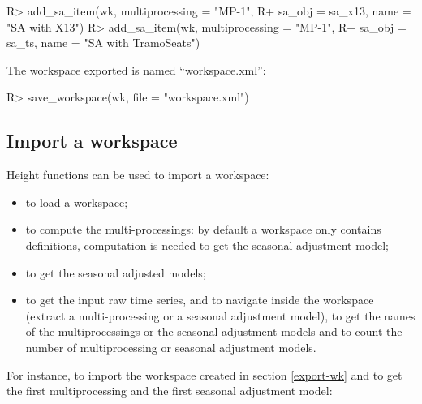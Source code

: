\documentclass[article]{jss}
\providecommand{\tightlist}{%
  \setlength{\itemsep}{0pt}\setlength{\parskip}{0pt}}
\begin{document}
\begin{CodeChunk}

\begin{CodeInput}
R> add_sa_item(wk, multiprocessing = "MP-1",
R+             sa_obj = sa_x13, name =  "SA with X13")
R> add_sa_item(wk, multiprocessing =  "MP-1",
R+             sa_obj = sa_ts, name = "SA with TramoSeats")
\end{CodeInput}
\end{CodeChunk}

The workspace exported is named ``workspace.xml'':

\begin{CodeChunk}

\begin{CodeInput}
R> save_workspace(wk, file =  "workspace.xml")
\end{CodeInput}
\end{CodeChunk}

\hypertarget{import-a-workspace}{%
\subsection{Import a workspace}\label{import-a-workspace}}

Height functions can be used to import a workspace:

\begin{itemize}
\tightlist
\item
   to load a workspace;\\
\item
   to compute the multi-processings: by default a
  workspace only contains definitions, computation is needed to get the
  seasonal adjustment model;\\
\item
   to get the seasonal adjusted models;\\
\item
   to get the input raw time series, 
  and  to navigate inside the workspace (extract a
  multi-processing or a seasonal adjustment model),  to
  get the names of the multiprocessings or the seasonal adjustment
  models and  to count the number of multiprocessing or
  seasonal adjustment models.
\end{itemize}

For instance, to import the workspace created in section \ref{export-wk}
and to get the first multiprocessing and the first seasonal adjustment
model:
\end{document}

